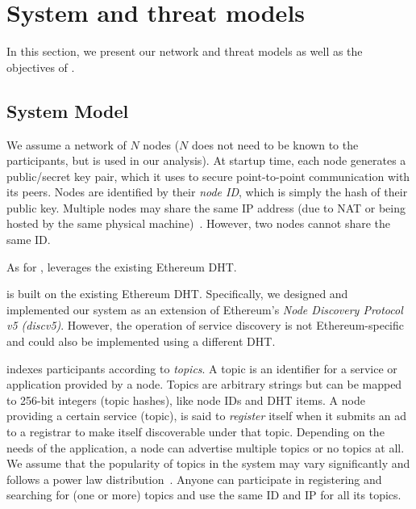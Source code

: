 
\section{System and threat models}
\label{sec:model}

In this section, we present our network and threat models as well as the objectives of \sysname. 

\subsection{System Model}

We assume a network of $N$ nodes ($N$ does not need to be known to the participants, but is used in our analysis).
At startup time, each node generates a public/secret key pair, which it uses to secure point-to-point communication with its peers.
Nodes are identified by their \emph{node ID}, which is simply the hash of their public key. Multiple nodes may share the same IP address (due to NAT or being hosted by the same physical machine)~\cite{marcus2018low}. However, two nodes cannot share the same ID.

As for \discv, \sysname leverages the existing Ethereum DHT.

\sysname is built on the existing Ethereum DHT. Specifically, we designed and implemented our system as an extension of Ethereum's \emph{Node Discovery Protocol v5 (discv5)}. However, the operation of service discovery is not Ethereum-specific and could also be implemented using a different DHT. 

\sysname indexes participants according to \emph{topics}. A topic is an identifier for a
service or application provided by a node. Topics are arbitrary strings but can be mapped to 256-bit integers (topic hashes), like node IDs and DHT items.
A node providing a certain service (topic), is said to \emph{register} itself when it submits an ad to a registrar  to make itself discoverable under that topic. Depending on the needs of the application, a node can advertise multiple topics or no topics at all. We assume that the popularity of topics in the system may vary significantly and follows a power law distribution~\cite{kim2018measuring}. Anyone can participate in registering and searching for (one or more) topics and use the same ID and IP for all its topics. 

